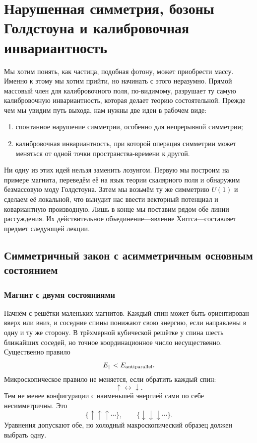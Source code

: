 \chapter{Нарушенная симметрия, бозоны Голдстоуна и калибровочная инвариантность}

Мы хотим понять, как частица, подобная фотону, может приобрести массу. Именно к этому мы хотим прийти, но начинать с этого неразумно. Прямой массовый член для калибровочного поля, по-видимому, разрушает ту самую калибровочную инвариантность, которая делает теорию состоятельной. Прежде чем мы увидим путь выхода, нам нужны две идеи в рабочем виде:
\begin{enumerate}
  \item спонтанное нарушение симметрии, особенно для непрерывной симметрии;
  \item калибровочная инвариантность, при которой операция симметрии может меняться от одной точки пространства-времени к другой.
\end{enumerate}
Ни одну из этих идей нельзя заменить лозунгом. Первую мы построим на примере магнита, переведём её на язык теории скалярного поля и обнаружим безмассовую моду Голдстоуна. Затем мы возьмём ту же симметрию \(U(1)\) и сделаем её локальной, что вынудит нас ввести векторный потенциал и ковариантную производную. Лишь в конце мы поставим рядом обе линии рассуждения. Их действительное объединение---явление Хиггса---составляет предмет следующей лекции.

\section{Симметричный закон с асимметричным основным состоянием}

\subsection{Магнит с двумя состояниями}

Начнём с решётки маленьких магнитов. Каждый спин может быть ориентирован вверх или вниз, и соседние спины понижают свою энергию, если направлены в одну и ту же сторону. В трёхмерной кубической решётке у спина шесть ближайших соседей, но точное координационное число несущественно. Существенно правило
\begin{equation}
  E_{\parallel}<E_{\rm antiparallel}.
\end{equation}
Микроскопическое правило не меняется, если обратить каждый спин:
\begin{equation}
  \uparrow\longleftrightarrow\downarrow.
\end{equation}
Тем не менее конфигурации с наименьшей энергией сами по себе несимметричны. Это
\begin{equation}
  \{\uparrow\uparrow\uparrow\cdots\},
  \qquad
  \{\downarrow\downarrow\downarrow\cdots\}.
\end{equation}
Уравнения допускают обе, но холодный макроскопический образец должен выбрать одну.

